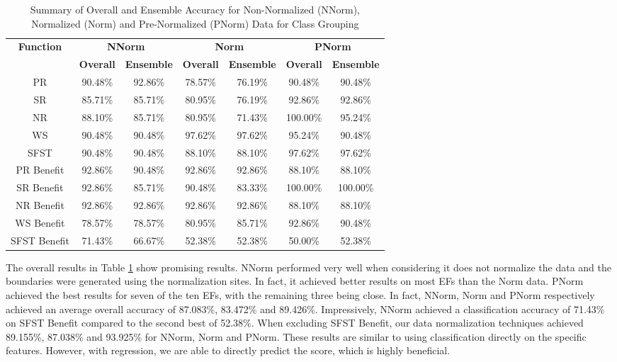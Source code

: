 \documentclass[12pt,letterpaper]{article}
\begin{document}
\begin{table}[H]
\centering
\begin{tabular}{|c||c|c||c|c||c|c|}
\hline
\multirow{2}{*}{\textbf{Function}} & \multicolumn{2}{c||}{\textbf{\ac{NNorm}}} & \multicolumn{2}{c||}{\textbf{Norm}} & \multicolumn{2}{c|}{\textbf{\ac{PNorm}}} \\
\cline{2-7}
 & \textbf{Overall} & \textbf{Ensemble} & \textbf{Overall} & \textbf{Ensemble} & \textbf{Overall} & \textbf{Ensemble} \\
\hline
PR & 90.48\% & 92.86\% & 78.57\% & 76.19\% & 90.48\% & 90.48\% \\
\hline
SR & 85.71\% & 85.71\% & 80.95\% & 76.19\% & 92.86\% & 92.86\% \\
\hline
NR & 88.10\% & 85.71\% & 80.95\% & 71.43\% & 100.00\% & 95.24\% \\
\hline
WS & 90.48\% & 90.48\% & 97.62\% & 97.62\% & 95.24\% & 90.48\% \\
\hline
SFST & 90.48\% & 90.48\% & 88.10\% & 88.10\% & 97.62\% & 97.62\% \\
\hline
PR Benefit & 92.86\% & 90.48\% & 92.86\% & 92.86\% & 88.10\% & 88.10\% \\
\hline
SR Benefit & 92.86\% & 85.71\% & 90.48\% & 83.33\% & 100.00\% & 100.00\% \\
\hline
NR Benefit & 92.86\% & 92.86\% & 92.86\% & 92.86\% & 88.10\% & 88.10\% \\
\hline
WS Benefit & 78.57\% & 78.57\% & 80.95\% & 85.71\% & 92.86\% & 90.48\% \\
\hline
SFST Benefit & 71.43\% & 66.67\% & 52.38\% & 52.38\% & 50.00\% & 52.38\% \\
\hline
\end{tabular}
\caption{Summary of Overall and Ensemble Accuracy for Non-Normalized (\ac{NNorm}), Normalized (Norm) and Pre-Normalized (\ac{PNorm}) Data for Class Grouping}
\label{reg_spec_tab:summary_class_grouping}
\end{table}

The overall results in Table \ref{reg_spec_tab:summary_class_grouping} show promising results.
\ac{NNorm} performed very well when considering it does not normalize the data and the boundaries were generated using the normalization sites.
In fact, it achieved better results on most \ac{EF}s than the \ac{Norm} data.
\ac{PNorm} achieved the best results for seven of the ten \ac{EF}s, with the remaining three being close.
In fact, \ac{NNorm}, \ac{Norm} and \ac{PNorm} respectively achieved an average overall accuracy of 87.083\%, 83.472\% and 89.426\%.
Impressively, \ac{NNorm} achieved a classification accuracy of 71.43\% on \ac{SFST} Benefit compared to the second best of 52.38\%.
When excluding \ac{SFST} Benefit, our data normalization techniques achieved 89.155\%, 87.038\% and 93.925\% for \ac{NNorm}, \ac{Norm} and \ac{PNorm}.
These results are similar to using classification directly on the specific features.
However, with regression, we are able to directly predict the score, which is highly beneficial.
\end{document}

